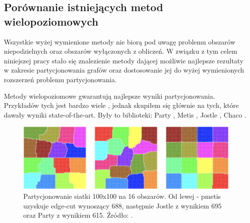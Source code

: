 \subsection{Porównanie istniejących metod wielopoziomowych}

Wszystkie wyżej wymienione metody nie biorą pod uwagę problemu obszarów niepodzielnych oraz obszarów wyłączonych z obliczeń.
W związku z tym celem niniejszej pracy stało się znalezienie metody dającej możliwie najlepsze rezultaty w zakresie partycjonowania grafów oraz
dostosowanie jej do wyżej wymienionych rozszerzeń problemu partycjonowania.

Metody wielopoziomowe gwarantują najlepsze wyniki partycjonowania.
Przykładów tych jest bardzo wiele \cite{metis, jostle, Bui1993AHF, 103500, 185177, 279334, inproceedings, 129970, 10.1145/165939.165942},
jednak skupiłem się głównie na tych, które dawały wyniki state-of-the-art. Były to biblioteki:
Party \cite{1364754}, Metis \cite{metis}, Jostle \cite{jostle}, Chaco \cite{inproceedings}.

\begin{figure}[h]
    \centering
    \includegraphics[width=0.7\linewidth]{images/libraries-comparision}
    \caption{Partycjonowanie siatki 100x100 na 16 obszarów. Od lewej - pmetis \cite{metis} uzyskuje edge-cut wynoszący
    688, następnie Jostle \cite{jostle} z wynikiem 695 oraz Party \cite{1364754} z wynikiem 615. Źródło: \cite{1364754}.}
    \label{im:partitioning_results}
\end{figure}

